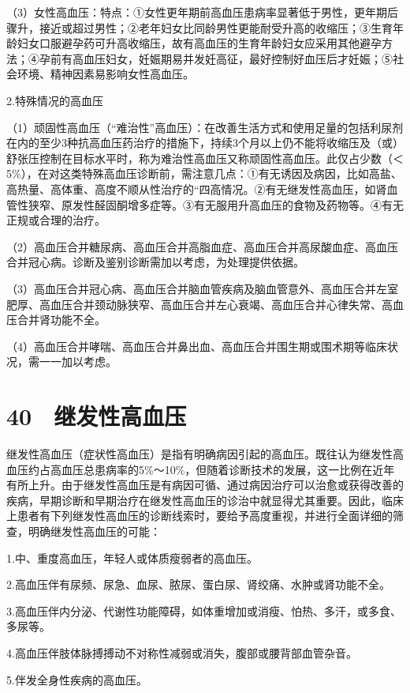 （3）女性高血压：特点：①女性更年期前高血压患病率显著低于男性，更年期后骤升，接近或超过男性；②老年妇女比同龄男性更能耐受升高的收缩压；③生育年龄妇女口服避孕药可升高收缩压，故有高血压的生育年龄妇女应采用其他避孕方法；④孕前有高血压妇女，妊娠期易并发妊高征，最好控制好血压后才妊娠；⑤社会环境、精神因素易影响女性高血压。

2.特殊情况的高血压

（1）顽固性高血压（“难治性”高血压）：在改善生活方式和使用足量的包括利尿剂在内的至少3种抗高血压药治疗的措施下，持续3个月以上仍不能将收缩压及（或）舒张压控制在目标水平时，称为难治性高血压又称顽固性高血压。此仅占少数（＜5\%），在对这类特殊高血压诊断前，需注意几点：①有无诱因及病因，比如高盐、高热量、高体重、高度不顺从性治疗的“四高情况。②有无继发性高血压，如肾血管性狭窄、原发性醛固酮增多症等。③有无服用升高血压的食物及药物等。④有无正规或合理的治疗。

（2）高血压合并糖尿病、高血压合并高脂血症、高血压合并高尿酸血症、高血压合并冠心病。诊断及鉴别诊断需加以考虑，为处理提供依据。

（3）高血压合并冠心病、高血压合并脑血管疾病及脑血管意外、高血压合并左室肥厚、高血压合并颈动脉狭窄、高血压合并左心衰竭、高血压合并心律失常、高血压合并肾功能不全。

（4）高血压合并哮喘、高血压合并鼻出血、高血压合并围生期或围术期等临床状况，需一一加以考虑。

\protect\hypertarget{text00109.html}{}{}

\section{40　继发性高血压}

继发性高血压（症状性高血压）是指有明确病因引起的高血压。既往认为继发性高血压约占高血压总患病率的5\%～10\%，但随着诊断技术的发展，这一比例在近年有所上升。由于继发性高血压是有病因可循、通过病因治疗可以治愈或获得改善的疾病，早期诊断和早期治疗在继发性高血压的诊治中就显得尤其重要。因此，临床上患者有下列继发性高血压的诊断线索时，要给予高度重视，并进行全面详细的筛查，明确继发性高血压的可能：

1.中、重度高血压，年轻人或体质瘦弱者的高血压。

2.高血压伴有尿频、尿急、血尿、脓尿、蛋白尿、肾绞痛、水肿或肾功能不全。

3.高血压伴内分泌、代谢性功能障碍，如体重增加或消瘦、怕热、多汗，或多食、多尿等。

4.高血压伴肢体脉搏搏动不对称性减弱或消失，腹部或腰背部血管杂音。

5.伴发全身性疾病的高血压。

